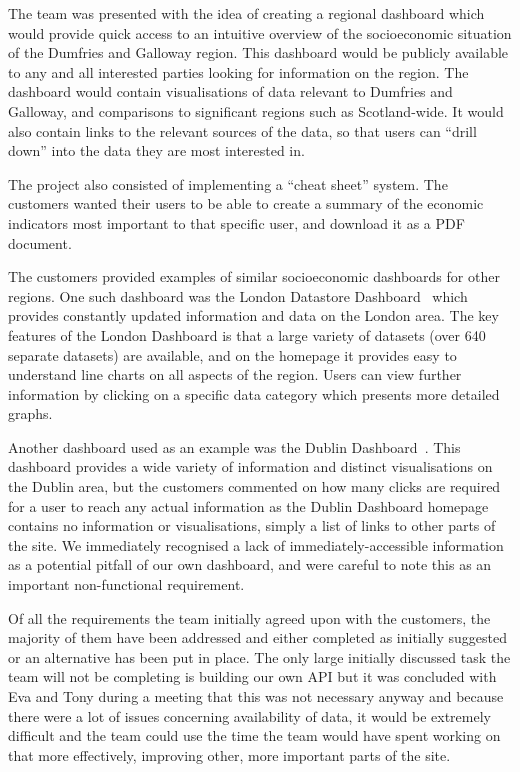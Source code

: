 \documentclass{l3proj}
\begin{document}
The team was presented with the idea of creating a regional dashboard which would provide quick access to an intuitive overview of the socioeconomic situation of the Dumfries and Galloway region. This dashboard would be publicly available to any and all interested parties looking for information on the region. The dashboard would contain visualisations of data relevant to Dumfries and Galloway, and comparisons to significant regions such as Scotland-wide. It would also contain links to the relevant sources of the data, so that users can ``drill down'' into the data they are most interested in.

The project also consisted of implementing a ``cheat sheet'' system. The customers wanted their users to be able to create a summary of the economic indicators most important to that specific user, and download it as a PDF document.

The customers provided examples of similar socioeconomic dashboards for other regions. One such dashboard was the London Datastore Dashboard~\cite{LondonDashboard} which provides constantly updated information and data on the London area. The key features of the London Dashboard is that a large variety of datasets (over 640 separate datasets) are available, and on the homepage it provides easy to understand line charts on all aspects of the region. Users can view further information by clicking on a specific data category which presents more detailed graphs.

Another dashboard used as an example was the Dublin Dashboard~\cite{DublinDashboard}. This dashboard provides a wide variety of information and distinct visualisations on the Dublin area, but the customers commented on how many clicks are required for a user to reach any actual information as the Dublin Dashboard homepage contains no information or visualisations, simply a list of links to other parts of the site. We immediately recognised a lack of immediately-accessible information as a potential pitfall of our own dashboard, and were careful to note this as an important non-functional requirement.


Of all the requirements the team initially agreed upon with the customers, the majority of them have been addressed and either completed as initially suggested
or an alternative has been put in place. The only large initially discussed task the team will not be completing is building our own API but it was concluded
with Eva and Tony during a meeting that this was not necessary anyway and because there were a lot of issues concerning availability of data, it would be
extremely difficult and the team could use the time the team would have spent working on that more effectively, improving other, more important parts of the site.
\end{document}
